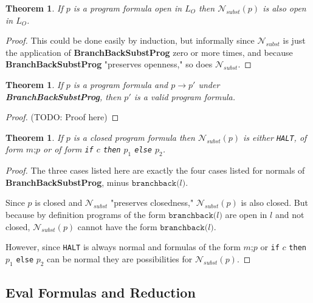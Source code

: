\documentclass[11pt]{article}
\begin{document}
\newtheorem*{nsubstpreservesopenness}{Theorem}
\begin{nsubstpreservesopenness}
If $p$ is a program formula open in $L_{O}$ then $\mathcal{N}_{subst}(p)$ is also open in $L_{O}$.
\end{nsubstpreservesopenness}
\begin{proof}
This could be done easily by induction, but informally since $\mathcal{N}_{subst}$ is just the application of \textbf{BranchBackSubstProg} zero or more times, and because \textbf{BranchBackSubstProg} "preserves openness," so does $\mathcal{N}_{subst}$.
\end{proof}

\newtheorem*{programformulaclosedness}{Theorem}
\begin{programformulaclosedness}
If $p$ is a program formula and $p \longrightarrow p'$ under \textbf{BranchBackSubstProg}, then $p'$ is a valid program formula.
\end{programformulaclosedness}

\begin{proof}
(TODO: Proof here)
\end{proof}

\newtheorem*{openformulanormalforms}{Theorem}
\begin{openformulanormalforms}
If $p$ is a closed program formula then $\mathcal{N}_{subst}(p)$ is either \texttt{HALT}, of form $m\texttt{;}p$ or of form \texttt{if} $c$ \texttt{then} $p_{1}$ \texttt{else} $p_{2}$.
\end{openformulanormalforms}

\begin{proof}
The three cases listed here are exactly the four cases listed for normals of \textbf{BranchBackSubstProg}, minus $\texttt{branchback(}l\texttt{)}$.

Since $p$ is closed and $\mathcal{N}_{subst}$ "preserves closedness," $\mathcal{N}_{subst}(p)$ is also closed.  But because by definition programs of the form $\texttt{branchback(}l\texttt{)}$ are open in ${l}$ and not closed, $\mathcal{N}_{subst}(p)$ cannot have the form $\texttt{branchback(}l\texttt{)}$.

However, since \texttt{HALT} is always normal and formulas of the form $m\texttt{;}p$ or \texttt{if} $c$ \texttt{then} $p_{1}$ \texttt{else} $p_{2}$ can be normal they are possibilities for $\mathcal{N}_{subst}(p)$.
\end{proof}

\subsection{Eval Formulas and Reduction}
\end{document}
